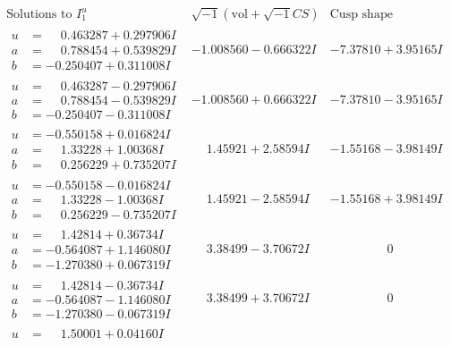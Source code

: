 \documentclass[1p]{elsarticle_modified}
\theoremstyle{definition}
\newcommand{\I}{\sqrt{-1}}
\begin{document}
$$\begin{array}{c|c|c}
\text{Solutions to }I^u_{1}& \I (\text{vol} + \sqrt{-1}CS) & \text{Cusp shape}\\
 \hline 
\begin{aligned}
u &= \phantom{-}0.463287 + 0.297906 I \\
a &= \phantom{-}0.788454 + 0.539829 I \\
b &= -0.250407 + 0.311008 I\end{aligned}
 & -1.008560 - 0.666322 I & -7.37810 + 3.95165 I \\ \hline\begin{aligned}
u &= \phantom{-}0.463287 - 0.297906 I \\
a &= \phantom{-}0.788454 - 0.539829 I \\
b &= -0.250407 - 0.311008 I\end{aligned}
 & -1.008560 + 0.666322 I & -7.37810 - 3.95165 I \\ \hline\begin{aligned}
u &= -0.550158 + 0.016824 I \\
a &= \phantom{-}1.33228 + 1.00368 I \\
b &= \phantom{-}0.256229 + 0.735207 I\end{aligned}
 & \phantom{-}1.45921 + 2.58594 I & -1.55168 - 3.98149 I \\ \hline\begin{aligned}
u &= -0.550158 - 0.016824 I \\
a &= \phantom{-}1.33228 - 1.00368 I \\
b &= \phantom{-}0.256229 - 0.735207 I\end{aligned}
 & \phantom{-}1.45921 - 2.58594 I & -1.55168 + 3.98149 I \\ \hline\begin{aligned}
u &= \phantom{-}1.42814 + 0.36734 I \\
a &= -0.564087 + 1.146080 I \\
b &= -1.270380 + 0.067319 I\end{aligned}
 & \phantom{-}3.38499 - 3.70672 I & \phantom{-0.000000 } 0 \\ \hline\begin{aligned}
u &= \phantom{-}1.42814 - 0.36734 I \\
a &= -0.564087 - 1.146080 I \\
b &= -1.270380 - 0.067319 I\end{aligned}
 & \phantom{-}3.38499 + 3.70672 I & \phantom{-0.000000 } 0 \\ \hline\begin{aligned}
u &= \phantom{-}1.50001 + 0.04160 I \\

\end{aligned}
\end{array}$$
\end{document}
